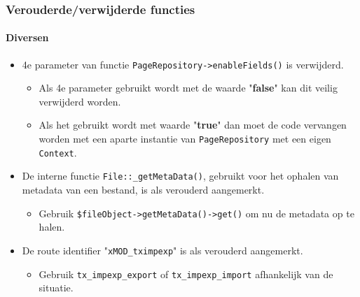 \begin{frame}[fragile]
	\frametitle{Verouderde/verwijderde functies}
	\framesubtitle{Diversen}

	\begin{itemize}

		\item 4e parameter van functie \texttt{PageRepository->enableFields()} is verwijderd.

		\begin{itemize}\smaller
			\item[\ding{228}] Als 4e parameter gebruikt wordt met de waarde "\textbf{false}" kan dit veilig verwijderd worden.
			\item[\ding{228}] Als het gebruikt wordt met waarde "\textbf{true}" dan moet de code vervangen worden met een aparte instantie van \texttt{PageRepository} met een eigen \texttt{Context}.
		\end{itemize}\normalsize

		\item De interne functie \texttt{File::\_getMetaData()}, gebruikt voor het ophalen van metadata van een bestand,
			is als verouderd aangemerkt.

			\begin{itemize}\smaller
				\item[\ding{228}] Gebruik \texttt{\$fileObject->getMetaData()->get()} om nu de metadata op te halen.
			\end{itemize}\normalsize

		\item De route identifier "\texttt{xMOD\_tximpexp}" is als verouderd aangemerkt.

			\begin{itemize}\smaller
				\item[\ding{228}] Gebruik \texttt{tx\_impexp\_export} of \texttt{tx\_impexp\_import} afhankelijk van de situatie.
			\end{itemize}\normalsize

	\end{itemize}

\end{frame}


